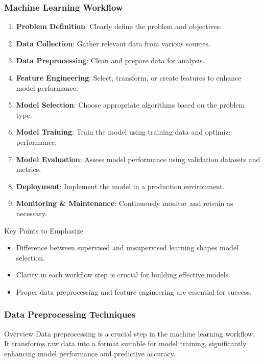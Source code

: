\documentclass[aspectratio=169]{beamer}
\begin{document}
\begin{frame}[fragile]
  \frametitle{Machine Learning Workflow}
  \begin{enumerate}
    \item \textbf{Problem Definition}: Clearly define the problem and objectives.
    \item \textbf{Data Collection}: Gather relevant data from various sources.
    \item \textbf{Data Preprocessing}: Clean and prepare data for analysis.
    \item \textbf{Feature Engineering}: Select, transform, or create features to enhance model performance.
    \item \textbf{Model Selection}: Choose appropriate algorithms based on the problem type.
    \item \textbf{Model Training}: Train the model using training data and optimize performance.
    \item \textbf{Model Evaluation}: Assess model performance using validation datasets and metrics.
    \item \textbf{Deployment}: Implement the model in a production environment.
    \item \textbf{Monitoring \& Maintenance}: Continuously monitor and retrain as necessary.
  \end{enumerate}
  
  \begin{block}{Key Points to Emphasize}
    \begin{itemize}
      \item Difference between supervised and unsupervised learning shapes model selection.
      \item Clarity in each workflow step is crucial for building effective models.
      \item Proper data preprocessing and feature engineering are essential for success.
    \end{itemize}
  \end{block}
\end{frame}

\begin{frame}[fragile]
    \frametitle{Data Preprocessing Techniques}
    \begin{block}{Overview}
        Data preprocessing is a crucial step in the machine learning workflow. It transforms raw data into a format suitable for model training, significantly enhancing model performance and predictive accuracy.
    \end{block}
\end{frame}
\end{document}
